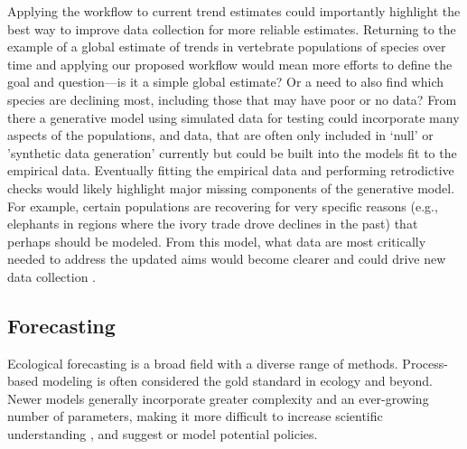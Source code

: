 \documentclass[11pt]{article}
\begin{document}
Applying the workflow to current trend estimates could importantly highlight the best way to improve data collection for more reliable estimates. Returning to the example of a global estimate of trends in vertebrate populations of species over time and applying our proposed workflow would mean more efforts to define the goal and question---is it a simple global estimate? Or a need to also find which species are declining most, including those that may have poor or no data? From there a generative model using simulated data for testing could incorporate many aspects of the populations, and data, that are often only included in `null' or 'synthetic data generation' currently \citep{Buschke2021,mcrae2025utility} but could be built into the models fit to the empirical data. Eventually fitting the empirical data and performing retrodictive checks would likely highlight major missing components of the generative model. For example, certain populations are recovering for very specific reasons (e.g., elephants in regions where the ivory trade drove declines in the past) that perhaps should be modeled. From this model, what data are most critically needed to address the updated aims would become clearer and could drive new data collection \citep{toszogyova2024mathematical}. 

\subsection{Forecasting}

Ecological forecasting is a broad field with a diverse range of methods. Process-based modeling is often considered the gold standard in ecology \citep{Urban2016, Pilowsky2022} and beyond. Newer models generally incorporate greater complexity and an ever-growing number of parameters, making it more difficult to increase scientific understanding \citep{Franklin2020}, and suggest or model potential policies.
\end{document}
